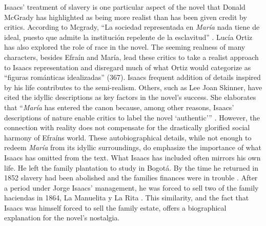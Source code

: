 \documentclass[12pt]{report}
\begin{document}
Isaacs' treatment of slavery is one particular aspect of the novel that Donald McGrady has highlighted as being more realist than has been given credit by critics. 
According to Mcgrady, \enquote{La sociedad representada en \textit{María} nada tiene de ideal, puesto que admite la institución repelente de la esclavitud} \autocite[24]{McGrady2012}.
Lucía Ortiz has also explored the role of race in the novel. 
The seeming realness of many characters, besides Efraín and María, lead these critics to take a realist approach to Isaacs representation and disregard much of what Ortiz would categorize as \enquote{figuras románticas idealizadas} (367)\nocite{Ortiz2007}. 
Isaacs frequent addition of details inspired by his life contributes to the semi-realism. 
Others, such as Lee Joan Skinner, have cited the idyllic descriptions as key factors in the novel's success.
She elaborates that \enquote{\textit{María} has entered the canon because, among other reasons, Isaacs' descriptions of nature enable critics to label the novel \enquote{authentic}} \autocite[13]{Skinner2014}.
However, the connection with reality does not compensate for the drastically glorified social harmony of Efraíns world. 
These autobiographical details, while not enough to redeem \textit{María} from its idyllic surroundings, do emphasize the importance of what Isaacs has omitted from the text.
What Isaacs has included often mirrors his own life. He left the family plantation to study in Bogotá. By the time he returned in 1852 slavery had been abolished and the families finances were in trouble \autocite[145]{Jagoe2003}. 
After a period under Jorge Isaacs' management, he was forced to sell two of the family haciendas in 1864, La Manuelita y La Rita \autocite[261]{Mejia1976}.
This similarity, and the fact that Isaacs was himself forced to sell the family estate, offers a biographical explanation for the novel's nostalgia. 


\end{document}
